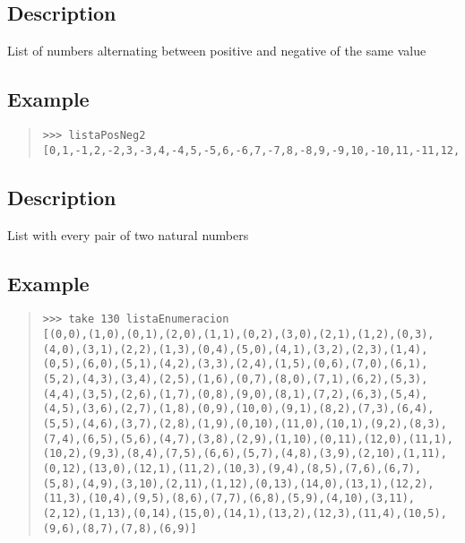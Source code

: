 \begin{haddockdesc}
\item[\begin{tabular}{@{}l}
listaPosNeg2 :: {\char 91}Int{\char 93}
\end{tabular}]
{\haddockbegindoc
\section*{Description}
List of numbers alternating between positive and negative of the same value\par
\subsection*{Example}
\begin{quote}
{\haddockverb\begin{verbatim}
>>> listaPosNeg2
[0,1,-1,2,-2,3,-3,4,-4,5,-5,6,-6,7,-7,8,-8,9,-9,10,-10,11,-11,12,-12,13,-13,14,-14,15,-15,16,-16,17,-17,18,-18,19,-19,20,-20,21,-21,22,-22,23,-23,24,-24,25,-25,26,-26,27,-27,28,-28,29,-29,30,-30,31,-31,32,-32,33,-33,34,-34,35,-35,36,-36,37,-37,38,-38,39,-39,40,-40,41,-41,42,-42,43,-43,44,-44,45,-45,46,-46,47,-47,48,-48,49,-49,50]

\end{verbatim}}
\end{quote}}
\end{haddockdesc}
\begin{haddockdesc}
\item[\begin{tabular}{@{}l}
listaEnumeracion :: {\char 91}(Int, Int){\char 93}
\end{tabular}]
{\haddockbegindoc
\section*{Description}
List with every pair of two natural numbers\par
\subsection*{Example}
\begin{quote}
{\haddockverb\begin{verbatim}
>>> take 130 listaEnumeracion
[(0,0),(1,0),(0,1),(2,0),(1,1),(0,2),(3,0),(2,1),(1,2),(0,3),(4,0),(3,1),(2,2),(1,3),(0,4),(5,0),(4,1),(3,2),(2,3),(1,4),(0,5),(6,0),(5,1),(4,2),(3,3),(2,4),(1,5),(0,6),(7,0),(6,1),(5,2),(4,3),(3,4),(2,5),(1,6),(0,7),(8,0),(7,1),(6,2),(5,3),(4,4),(3,5),(2,6),(1,7),(0,8),(9,0),(8,1),(7,2),(6,3),(5,4),(4,5),(3,6),(2,7),(1,8),(0,9),(10,0),(9,1),(8,2),(7,3),(6,4),(5,5),(4,6),(3,7),(2,8),(1,9),(0,10),(11,0),(10,1),(9,2),(8,3),(7,4),(6,5),(5,6),(4,7),(3,8),(2,9),(1,10),(0,11),(12,0),(11,1),(10,2),(9,3),(8,4),(7,5),(6,6),(5,7),(4,8),(3,9),(2,10),(1,11),(0,12),(13,0),(12,1),(11,2),(10,3),(9,4),(8,5),(7,6),(6,7),(5,8),(4,9),(3,10),(2,11),(1,12),(0,13),(14,0),(13,1),(12,2),(11,3),(10,4),(9,5),(8,6),(7,7),(6,8),(5,9),(4,10),(3,11),(2,12),(1,13),(0,14),(15,0),(14,1),(13,2),(12,3),(11,4),(10,5),(9,6),(8,7),(7,8),(6,9)]

\end{verbatim}}
\end{quote}}
\end{haddockdesc}
